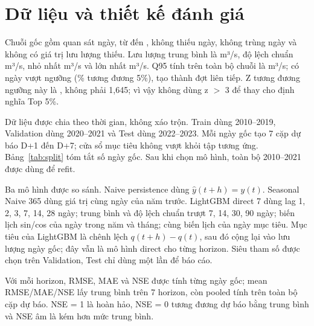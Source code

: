 \section{Dữ liệu và thiết kế đánh giá}

Chuỗi gốc gồm \DatasetN{} quan sát ngày, từ \DateMin{} đến \DateMax{}, không thiếu
ngày, không trùng ngày và không có giá trị lưu lượng thiếu. Lưu lượng trung bình là
\QMean{} m³/s, độ lệch chuẩn \QStd{} m³/s, nhỏ nhất \QMin{} m³/s và lớn nhất
\QMax{} m³/s. Q95 tính trên toàn bộ chuỗi là \QHigh{} m³/s; có \NDaysHigh{} ngày vượt
ngưỡng (\ShareHigh\% tương đương 5\%), tạo thành \NEvents{} đợt liên tiếp. Z tương
đương ngưỡng này là \ZThreshold, không phải 1,645; vì vậy không dùng z $>$ 3 để thay
cho định nghĩa Top 5\%.

Dữ liệu được chia theo thời gian, không xáo trộn. Train dùng 2010--2019, Validation
dùng 2020--2021 và Test dùng 2022--2023. Mỗi ngày gốc tạo 7 cặp dự báo D+1 đến D+7;
cửa sổ mục tiêu không vượt khỏi tập tương ứng. Bảng~\ref{tab:split} tóm tắt số ngày
gốc. Sau khi chọn mô hình, toàn bộ 2010--2021 được dùng để refit.

\begin{table}[H]
\centering
\caption{Chia tập theo thời gian}
\label{tab:split}
\small

\end{table}

Ba mô hình được so sánh. Naive persistence dùng $\hat y(t+h)=y(t)$. Seasonal Naive
365 dùng giá trị cùng ngày của năm trước. LightGBM direct 7 dùng lag 1, 2, 3, 7, 14,
28 ngày; trung bình và độ lệch chuẩn trượt 7, 14, 30, 90 ngày; biến lịch sin/cos của
ngày trong năm và tháng; cùng biến lịch của ngày mục tiêu. Mục tiêu của LightGBM là
chênh lệch $q(t+h)-q(t)$, sau đó cộng lại vào lưu lượng ngày gốc; đây vẫn là mô hình
direct cho từng horizon. Siêu tham số được chọn trên Validation, Test chỉ dùng một lần
để báo cáo.

Với mỗi horizon, RMSE, MAE và NSE được tính từng ngày gốc; mean RMSE/MAE/NSE lấy
trung bình trên 7 horizon, còn pooled tính trên toàn bộ cặp dự báo. NSE = 1 là hoàn
hảo, NSE = 0 tương đương dự báo bằng trung bình và NSE âm là kém hơn mức trung bình.
